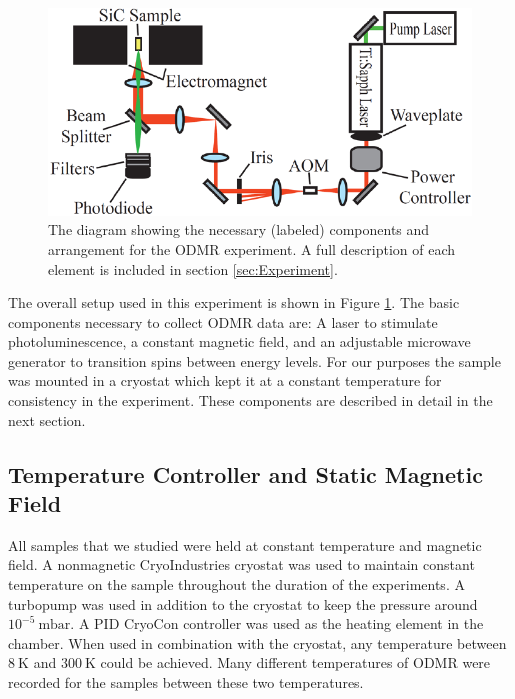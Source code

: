 \documentclass[oneside, noacknowlegments]{BYUPhys}
\begin{document}
\begin{figure}
    \centerline{\includegraphics{setup_fig}}
    \caption[Diagram of Experimental Setup for ODMR]{\label{fig:setup}
     The diagram showing the necessary (labeled) components and arrangement for the ODMR experiment. A full description of each element is included in section \ref{sec:Experiment}.}
 \end{figure}

The overall setup used in this experiment is shown in Figure \ref{fig:setup}. The basic components necessary to collect ODMR data are: A laser to stimulate photoluminescence, a constant magnetic field, and an adjustable microwave generator to transition spins between energy levels. For our purposes the sample was mounted in a cryostat which kept it at a constant temperature for consistency in the experiment. These components are described in detail in the next section.

\subsection{Temperature Controller and Static Magnetic Field}

All samples that we studied were held at constant temperature and magnetic field. A nonmagnetic CryoIndustries cryostat was used to maintain constant temperature on the sample throughout the duration of the experiments. A turbopump was used in addition to the cryostat to keep the pressure around $10^{-5}~\text{mbar}$. A PID CryoCon controller was used as the heating element in the chamber. When used in combination with the cryostat, any temperature between $8~\text{K}$ and $300~\text{K}$ could be achieved. Many different temperatures of ODMR were recorded for the samples between these two temperatures.
\end{document}
